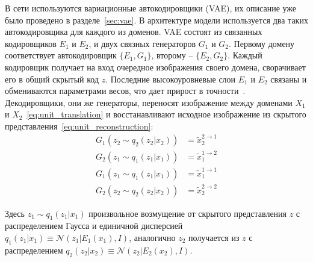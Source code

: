\documentclass[11pt,a4paper]{extarticle}
\begin{document}
{		В сети используются вариационные автокодировщики (VAE), их описание уже было проведено в разделе~\ref{sec:vae}. В архитектуре модели используется два таких автокодировщика для каждого из доменов.
		VAE состоят из связанных кодировщиков \(E_1\) и \(E_2\), и двух связных генераторов \(G_1\) и \(G_2\).
		Первому домену соответствует автокодировщик \(\{ E_1,G_1 \}\), второму -- \(\{ E_2,G_2 \}\).
		Каждый кодировщик получает на вход очередное изображения своего домена, сворачивает его в общий скрытый код \(z\).
		Последние высокоуровневые слои \(E_1\) и \(E_2\) связаны и обмениваются параметрами весов, что дает прирост в точности~\cite{coGAN}.
		Декодировщики, они же генераторы, переносят изображение между доменами \(X_1\) и \(X_2\)~\eqref{eq:unit_translation} и восстанавливают исходное изображение из скрытого представления~\eqref{eq:unit_reconstruction}:
		\begin{equation}\label{eq:unit_translation}
			\begin{aligned}
				G_1(z_2 \sim q_2(z_2|x_2)) &= \tilde{x}^{2 \rightarrow 1}_2 \\
				G_2(z_1 \sim q_1(z_1|x_1)) &= \tilde{x}^{1 \rightarrow 2}_1 
			\end{aligned}
		\end{equation}
		\begin{equation}\label{eq:unit_reconstruction}
			\begin{aligned}
				G_1(z_1 \sim q_1(z_1|x_1)) &= \tilde{x}^{1 \rightarrow 1}_1 \\
				G_2(z_2 \sim q_2(z_2|x_2)) &= \tilde{x}^{2 \rightarrow 2}_2
			\end{aligned}
		\end{equation}

		\noindent
		Здесь \(z_1 \sim q_1(z_1|x_1)\) произвольное возмущение от скрытого представления \(z\) с распределением Гаусса и единичной дисперсией \(q_1(z_1|x_1) \equiv \mathcal{N}(z_1|E_1(x_1), I)\),
		аналогично \(z_2\) получается из \(z\) с распределением \(q_2(z_2|x_2) \equiv \mathcal{N}(z_2|E_2(x_2), I)\).

}
\end{document}
